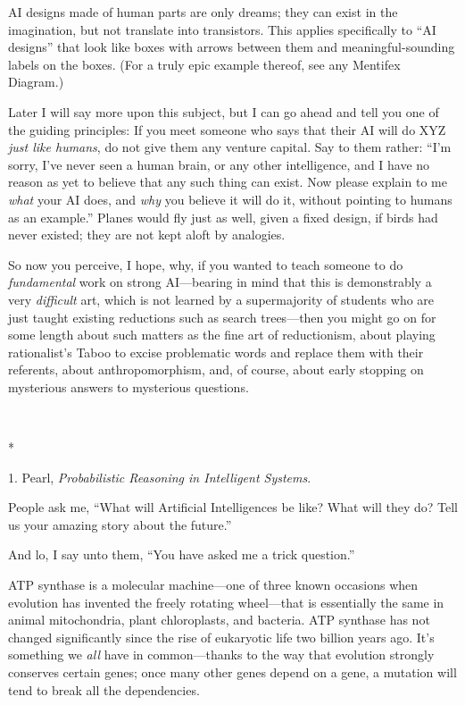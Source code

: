 {
 AI designs made of human parts are only dreams; they can exist in
the imagination, but not translate into transistors. This applies
specifically to ``AI designs'' that
look like boxes with arrows between them and meaningful-sounding labels
on the boxes. (For a truly epic example thereof, see any Mentifex
Diagram.)}

{
 Later I will say more upon this subject, but I can go ahead and
tell you one of the guiding principles: If you meet someone who says
that their AI will do XYZ \textit{just like humans}, do not give them
any venture capital. Say to them rather:
``I'm sorry, I've
never seen a human brain, or any other intelligence, and I have no
reason as yet to believe that any such thing can exist. Now please
explain to me \textit{what} your AI does, and \textit{why} you believe
it will do it, without pointing to humans as an
example.'' Planes would fly just as well, given a
fixed design, if birds had never existed; they are not kept aloft by
analogies.}

{
 So now you perceive, I hope, why, if you wanted to teach someone
to do \textit{fundamental} work on strong AI---bearing in mind that
this is demonstrably a very \textit{difficult} art, which is not
learned by a supermajority of students who are just taught existing
reductions such as search trees---then you might go on for some length
about such matters as the fine art of reductionism, about playing
rationalist's Taboo to excise problematic words and
replace them with their referents, about anthropomorphism, and, of
course, about early stopping on mysterious answers to mysterious
questions.}

{\centering
 \ ~
\par}

{\centering
 *
\par}


\bigskip

{
 1. Pearl, \textit{Probabilistic Reasoning in Intelligent
Systems}.}


{
 People ask me, ``What will Artificial
Intelligences be like? What will they do? Tell us your amazing story
about the future.'' }

{
 And lo, I say unto them, ``You have asked me a
trick question.''}

{
 ATP synthase is a molecular machine---one of three known occasions
when evolution has invented the freely rotating wheel---that is
essentially the same in animal mitochondria, plant chloroplasts, and
bacteria. ATP synthase has not changed significantly since the rise of
eukaryotic life two billion years ago. It's something
we \textit{all} have in common---thanks to the way that evolution
strongly conserves certain genes; once many other genes depend on a
gene, a mutation will tend to break all the dependencies.}

